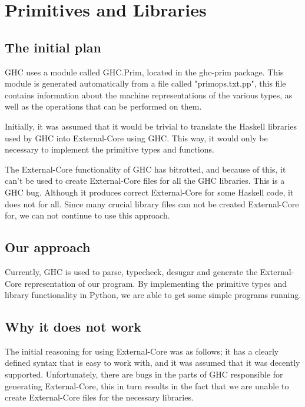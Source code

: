 

\chapter{Primitives and Libraries}
\label{chap:prims}



\section{The initial plan}

GHC uses a module called GHC.Prim, located in the ghc-prim package. This
module is generated automatically from a file called "primops.txt.pp", this file
contains information about the machine representations of the various types, as
well as the operations that can be performed on them.

Initially, it was assumed that it would be trivial to translate the Haskell
libraries used by GHC into External-Core using GHC. This way, it would only 
be necessary to implement the primitive types and functions.

The External-Core functionality of GHC has bitrotted, and because of this, it can't be
used to create External-Core files for all the GHC libraries. This is a GHC bug. 
Although it produces correct
External-Core for some Haskell code, it does not for all. Since many crucial library files
can not be created External-Core for, we can not continue to use this approach.

\section{Our approach}

Currently, GHC is used to parse, typecheck, desugar and generate the 
External-Core representation of our program. By implementing the
primitive types and library functionality in Python, we are able to
get some simple programs running.


\section{Why it does not work}


The initial reasoning for using External-Core was as follows;
it has a clearly defined syntax that is easy to work with, and it was 
assumed that it was decently supported. Unfortunately, there are bugs in
the parts of GHC responsible for generating External-Core, this in turn
results in the fact that we are unable to create External-Core files for the
necessary libraries.


